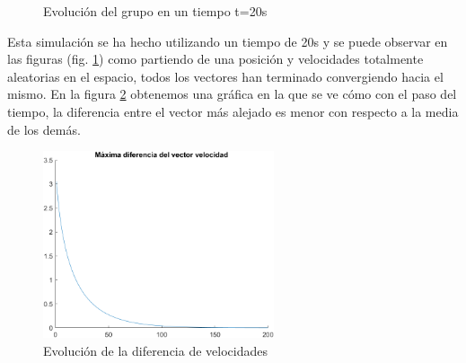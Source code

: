 \begin{figure}[htbp]
\centering
\caption{Evolución del grupo en un tiempo t=20s} 
\label{fig:CS025_pos}
\end{figure}

Esta simulación se ha hecho utilizando un tiempo de 20s y se puede observar en las figuras (fig. \ref{fig:CS025_pos}) como partiendo de una posición y velocidades totalmente aleatorias en el espacio, todos los vectores han terminado convergiendo hacia el mismo. En la figura \ref{fig:CS025_vel} obtenemos una gráfica en la que se ve cómo con el paso del tiempo, la diferencia entre el vector más alejado es menor con respecto a la media de los demás. 
\begin{figure}
    \centering
    \includegraphics[height=5.5cm]{fig/cap04/1CSB025/velocidad.png}
    \caption{Evolución de la diferencia de velocidades}
    \label{fig:CS025_vel}
\end{figure}

